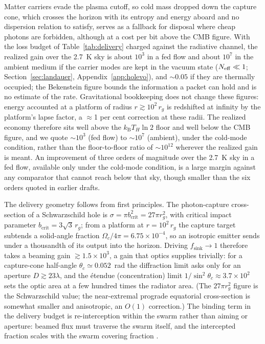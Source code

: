\documentclass[11pt]{article}
\newcommand{\kb}{\ensuremath{k_{\mathrm{B}}}}
\begin{document}
Matter carriers evade the plasma cutoff, so cold mass dropped down the capture cone, which crosses the horizon with its entropy and energy aboard and no dispersion relation to satisfy, serves as a fallback for disposal where cheap photons are forbidden, although at a cost per bit above the CMB figure. With the loss budget of Table~\ref{tab:delivery} charged against the radiative channel, the realized gain over the 2.7~K sky is about $10^{3}$ in a fed flow and about $10^{7}$ in the ambient medium if the carrier modes are kept in the vacuum state ($N_{\rm eff}\ll1$; Section~\ref{sec:landauer}, Appendix~\ref{app:holevo}), and $\sim 0.05$ if they are thermally occupied; the Bekenstein figure bounds the information a packet can hold and is no estimate of the rate. Gravitational bookkeeping does not change these figures: energy accounted at a platform of radius $r \gtrsim 10^{2}\,r_g$ is redshifted at infinity by the platform's lapse factor, a $\approx$1 per cent correction at these radii. The realized economy therefore sits well above the $\kb T_H \ln 2$ floor and well below the CMB figure, and we quote $\sim 10^{3}$ (fed flow) to $\sim 10^{7}$ (ambient), under the cold-mode condition, rather than the floor-to-floor ratio of $\sim$$10^{12}$ wherever the realized gain is meant. An improvement of three orders of magnitude over the 2.7~K sky in a fed flow, available only under the cold-mode condition, is a large margin against any comparator that cannot reach below that sky, though smaller than the six orders quoted in earlier drafts.

The delivery geometry follows from first principles. The photon-capture cross-section of a Schwarzschild hole is $\sigma = \pi b_{\mathrm{crit}}^{2} = 27\pi r_g^{2}$, with critical impact parameter $b_{\mathrm{crit}} = 3\sqrt{3}\,r_g$; from a platform at $r = 10^{2}\,r_g$ the capture target subtends a solid-angle fraction $\Omega_c/4\pi = 6.75\times10^{-4}$, so an isotropic emitter sends under a thousandth of its output into the horizon. Driving $f_{\mathrm{sink}} \to 1$ therefore takes a beaming gain $\gtrsim 1.5\times10^{3}$, a gain that optics supplies trivially: for a capture-cone half-angle $\theta_c \simeq 0.052$~rad the diffraction limit asks only for an aperture $D \gtrsim 23\lambda$, and the \'etendue (concentration) limit $1/\sin^{2}\theta_c \approx 3.7\times10^{2}$ sets the optic area at a few hundred times the radiator area. (The $27\pi r_g^{2}$ figure is the Schwarzschild value; the near-extremal prograde equatorial cross-section is somewhat smaller and anisotropic, an $O(1)$ correction.) The binding term in the delivery budget is re-interception within the swarm rather than aiming or aperture: beamed flux must traverse the swarm itself, and the intercepted fraction scales with the swarm covering fraction \citep{Swanson2026Engineered}.
\end{document}
